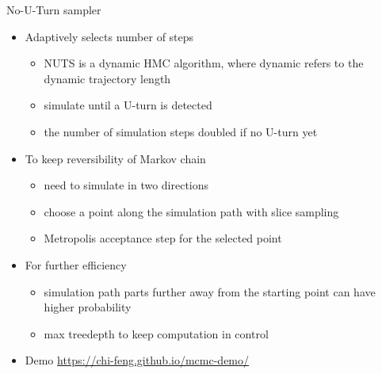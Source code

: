 \documentclass[finnish,english,t]{beamer}
\begin{document}
\begin{frame}{No-U-Turn sampler}

  \vspace{-0.5\baselineskip}
    \begin{itemize}
    \item Adaptively selects number of steps
      \begin{itemize}
      \item NUTS is a dynamic HMC algorithm, where dynamic refers to
        the dynamic trajectory length
      \item<2-> simulate until a U-turn is detected
      \item<2-> the number of simulation steps doubled if no U-turn yet\\
      \end{itemize}
    \item<3-> To keep reversibility of Markov chain
      \begin{itemize}
      \item need to simulate in two directions
      \item choose a point along the simulation path with slice
        sampling
      \item Metropolis acceptance step for the selected point
      \end{itemize}
    \item<4-> For further efficiency
      \begin{itemize}
      \item simulation path parts further away from the starting point
        can have higher probability
      \item max treedepth to keep computation in control
      \end{itemize}
    \item<5-> Demo \url{https://chi-feng.github.io/mcmc-demo/}
    \end{itemize}

\end{frame}
\end{document}
